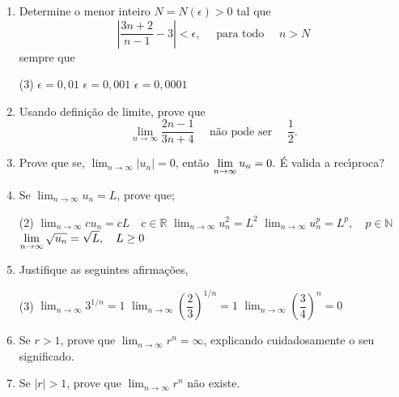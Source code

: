 \begin{enumerate}[label=\rm{(\arabic*)}]
\item Determine o menor inteiro $N=N(\epsilon)>0$ tal que
\begin{equation*}
\left|\frac{3n+2}{n-1}-3\right|<\epsilon, \quad \text{ para todo }\quad  n>N
\end{equation*}
sempre que
\begin{tasks}[label=\rm{(\alph*)},item-indent=4em,label-width=4ex,ref=\rm{(\alph*)}](3)
\task  \(\epsilon=0,01 \)
\task  \(\epsilon=0,001 \)
\task  \(\epsilon=0,0001\)
\end{tasks}

\item Usando defini\c c\~ao de limite, prove que
\begin{equation*}
\lim_{n\to\infty} \frac{2n-1}{3n+4}\quad \text{ n\~ao pode ser } \quad \frac{1}{2}.
\end{equation*}

\item Prove que se, $\displaystyle{\lim_{n\to\infty}|u_n|=0}$, ent\~ao $\displaystyle{\lim_{n\to\infty}u_n=0.}$
\'E valida a rec\'\i proca?

\item Se $\displaystyle{\lim_{n\to\infty}u_n=L}$, prove que;
\begin{tasks}[label=\rm{(\alph*)},item-indent=4em,label-width=4ex,ref=\rm{(\alph*)}](2)
\task  \(\displaystyle{\lim_{n\to\infty}cu_n=cL}\quad c\in \mathbb{R}\)
\task \(\displaystyle{\lim_{n\to\infty}u_n^2=L^2}\)
\task \(\displaystyle{\lim_{n\to\infty}u_n^p=L^p},\quad p\in \mathbb N\)
\task \(\displaystyle \lim_{n\to\infty}\sqrt{u_n}=\sqrt{L},\quad L\geq 0\)
\end{tasks}

\item Justifique as seguintes afirmações,
\begin{tasks}[label=\rm{(\alph*)},item-indent=4em,label-width=4ex,ref=\rm{(\alph*)}](3)
\task \(\displaystyle{\lim_{n\to\infty}3^{1/n}=1}\)
\task \(\displaystyle{\lim_{n\to\infty}\left(\dfrac{2}{3}\right)^{1/n}=1}\)
\task \(\displaystyle{\lim_{n\to\infty}\left(\dfrac{3}{4}\right)^{n}=0}\)
\end{tasks}

\item Se $r>1$, prove que $\displaystyle{\lim_{n\to\infty}r^{n}=\infty}$,
explicando cuidadosamente o seu significado.

\item Se $|r|>1$, prove que $\displaystyle{\lim_{n\to\infty}r^{n}}$ n\~ao existe.


\end{enumerate}
